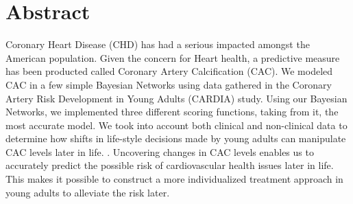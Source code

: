 \section{Abstract}
\begin{comment}


We created a Bayesian Network that models and tracks human behavior.  The data set that we used consists of health records from 5,115 black and white, males and females, ages 18-30, called CARDIA data.\cite{Friedman1988}  Using the CARDIA data we were able to track behavioral changes amongst patients, through the implementation of our Bayesian Network.  Our Network then, modeled these changes and made statistical inferences based off different attributes within our network.  These inferences can aid physicians in building a patient specific decision support model. Hospitals can then use these decision support models to produce a more personalized medical approach for treating their patients.
\end{comment}


Coronary Heart Disease (CHD) has had a serious impacted  amongst the American population.  Given the concern for Heart health, a predictive measure has been producted called Coronary Artery Calcification (CAC).  We modeled CAC in a few simple Bayesian Networks using data gathered in the Coronary Artery Risk Development in Young Adults (CARDIA) study.  Using our Bayesian Networks, we implemented three different scoring functions, taking from it, the most accurate model. We took into account both clinical and non-clinical data to determine how shifts in life-style decisions made by young adults can manipulate CAC levels later in life. \cite{Yang}.  Uncovering changes in CAC levels enables us to accurately predict the possible risk of cardiovascular health issues later in life.  This makes it possible to construct a more individualized treatment approach in young adults to alleviate the risk later.  





